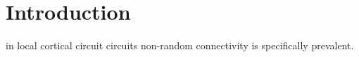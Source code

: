 
\section*{Introduction}


\cite{Song2005}
in local cortical circuit circuits non-random connectivity is specifically prevalent. 
